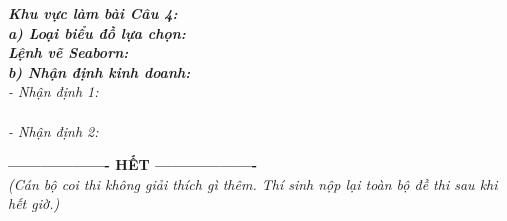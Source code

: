 \documentclass[11pt,a4paper]{article}
\newcommand{\answerbox}[2]{
  \vspace{1mm}
  \begin{tcolorbox}[
    colback=white,
    colframe=gray!60,
    boxrule=0.6pt,
    arc=2pt,
    height=#1,
    left=3mm, right=3mm, top=2mm, bottom=2mm
  ]
  \small\textit{\color{gray}#2}
  \end{tcolorbox}
  \vspace{1mm}
}
\begin{document}
\answerbox{5.0cm}{
\textbf{Khu vực làm bài Câu 4:}\\[1.5mm]
\textbf{a) Loại biểu đồ lựa chọn:} \dotfill\\[2mm]
\textbf{Lệnh vẽ Seaborn:} \dotfill\\[3mm]
\textbf{b) Nhận định kinh doanh:}\\
- Nhận định 1: \dotfill\\[2mm]
\hspace*{2.2cm}\dotfill\\[2mm]
- Nhận định 2: \dotfill\\[2mm]
\hspace*{2.2cm}\dotfill
}

\vspace{1mm}
\begin{center}
\textbf{------------------- HẾT -------------------}\\
\textit{\small (Cán bộ coi thi không giải thích gì thêm. Thí sinh nộp lại toàn bộ đề thi sau khi hết giờ.)}
\end{center}
\end{document}
